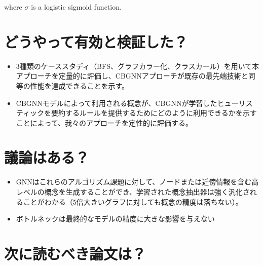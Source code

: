 \documentclass[a4paper,10pt]{ltjsarticle}
\newcommand{\1}{\mbox{1}\hspace{-0.25em}\mbox{l}}
\theoremstyle{definition}
\begin{document}
    where $\sigma$ is a logistic sigmoid function.


    \section{どうやって有効と検証した？}
    \begin{itemize}
        \item 3種類のケーススタディ（BFS、グラフカラー化、クラスカール）を用いて本アプローチを定量的に評価し、CBGNNアプローチが既存の最先端技術と同等の性能を達成できることを示す。
        \item CBGNNモデルによって利用される概念が、CBGNNが学習したヒューリスティックを要約するルールを提供するためにどのように利用できるかを示すことによって、我々のアプローチを定性的に評価する。
    \end{itemize}


    \section{議論はある？}
    \begin{itemize}
        \item GNNはこれらのアルゴリズム課題に対して、ノードまたは近傍情報を含む高レベルの概念を生成することができ、学習された概念抽出器は強く汎化されることがわかる（5倍大きいグラフに対しても概念の精度は落ちない）。
        \item ボトルネックは最終的なモデルの精度に大きな影響を与えない
    \end{itemize}


    \section{次に読むべき論文は？}

    
    
\end{document}
